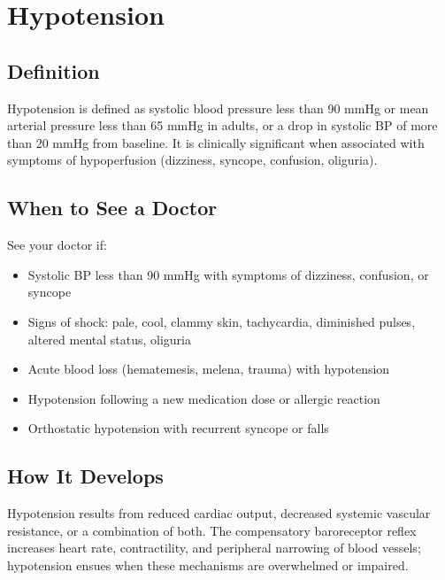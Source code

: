 \chapter{Hypotension}

\section*{Definition}
Hypotension is defined as systolic blood pressure less than 90 mmHg or mean arterial pressure less than 65 mmHg in adults, or a drop in systolic BP of more than 20 mmHg from baseline. It is clinically significant when associated with symptoms of hypoperfusion (dizziness, syncope, confusion, oliguria).

\section*{When to See a Doctor}
See your doctor if:
\begin{itemize}
  \item Systolic BP less than 90 mmHg with symptoms of dizziness, confusion, or syncope
  \item Signs of shock: pale, cool, clammy skin, tachycardia, diminished pulses, altered mental status, oliguria
  \item Acute blood loss (hematemesis, melena, trauma) with hypotension
  \item Hypotension following a new medication dose or allergic reaction
  \item Orthostatic hypotension with recurrent syncope or falls
\end{itemize}

\section*{How It Develops}
Hypotension results from reduced cardiac output, decreased systemic vascular resistance, or a combination of both. The compensatory baroreceptor reflex increases heart rate, contractility, and peripheral narrowing of blood vessels; hypotension ensues when these mechanisms are overwhelmed or impaired.

